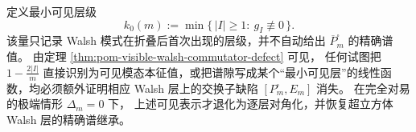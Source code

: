 \begin{remark}[可见层级与谱继承需要分离讨论]\label{rem:pom-visible-walsh-gap-separation}
定义最小可见层级
\[
k_0(m):=\min\{\,|I|\ge 1:\ g_I\not\equiv 0\,\}.
\]
该量只记录 Walsh 模式在折叠后首次出现的层级，并不自动给出 \(\overline P_m^\square\) 的精确谱值。
由定理 \ref{thm:pom-visible-walsh-commutator-defect} 可见，
任何试图把
\(
1-\frac{2|I|}{m}
\)
直接识别为可见模态本征值，或把谱隙写成某个“最小可见层”的线性函数，均必须额外证明相应 Walsh 层上的交换子缺陷 \([P_m^\square,E_m]\) 消失。
在完全对易的极端情形 \(\mathsf \Delta_m=0\) 下，
上述可见表示才退化为逐层对角化，并恢复超立方体 Walsh 层的精确谱继承。
\end{remark}

\endinput
